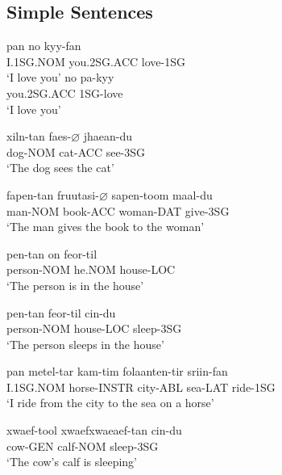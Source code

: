 \documentclass[main.tex]{subfiles}
\begin{document}
\subsection{Simple Sentences}
\begin{exe}
    \ex
        \gll pan no kyy-fan\\
        I.1SG.NOM you.2SG.ACC love-1SG\\
        \trans `I love you'
    \ex
        \gll no pa-kyy\\
        you.2SG.ACC 1SG-love\\
        \trans `I love you'

    \ex \gll xiln-tan faes-$\varnothing$ jhaean-du\\
        dog-NOM cat-ACC see-3SG\\
        \trans `The dog sees the cat'

    \ex \gll fapen-tan fruutasi-$\varnothing$ sapen-toom maal-du\\
        man-NOM book-ACC woman-DAT give-3SG\\
        \trans `The man gives the book to the woman'

    \ex \gll pen-tan on feor-til\\
        person-NOM he.NOM house-LOC\\
        \trans `The person is in the house'

    \ex \gll pen-tan feor-til cin-du\\
        person-NOM house-LOC sleep-3SG\\
        \trans `The person sleeps in the house'

    \ex \gll pan metel-tar kam-tim folaanten-tir sriin-fan\\
        I.1SG.NOM horse-INSTR city-ABL sea-LAT ride-1SG\\
        \trans `I ride from the city to the sea on a horse'

    \ex \gll xwaef-tool xwaefxwaeaef-tan cin-du\\
        cow-GEN calf-NOM sleep-3SG\\
        \trans `The cow's calf is sleeping'
\end{exe}
\end{document}
